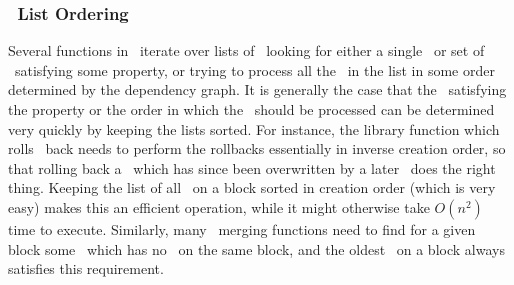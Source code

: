 \subsubsection{\ChDesc\ List Ordering}
Several functions in \Kudos\ iterate over lists of \chdescs\ looking for either
a single \chdesc\ or set of \chdescs\ satisfying some property, or trying to
process all the \chdescs\ in the list in some order determined by the dependency
graph. It is generally the case that the \chdescs\ satisfying the property or
the order in which the \chdescs\ should be processed can be determined very
quickly by keeping the lists sorted. For instance, the library function which
rolls \chdescs\ back needs to perform the rollbacks essentially in inverse
creation order, so that rolling back a \chdesc\ which has since been overwritten
by a later \chdesc\ does the right thing. Keeping the list of all \chdescs\ on a
block sorted in creation order (which is very easy) makes this an efficient
operation, while it might otherwise take $O(n^2)$ time to execute. Similarly,
many \chdesc\ merging functions need to find for a given block some \chdesc\
which has no \befores\ on the same block, and the oldest \chdesc\ on a block
always satisfies this requirement.
